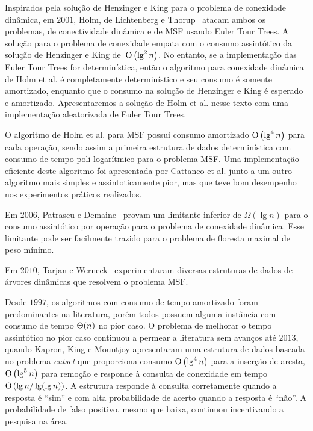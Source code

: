 Inspirados pela solução de Henzinger e King para o problema de conexidade dinâmica, em $2001$, Holm, de Lichtenberg e Thorup~\cite{poly_log} atacam ambos os problemas, de conectividade dinâmica e de MSF usando Euler Tour Trees. A solução para o problema de conexidade empata com o consumo assintótico da solução de Henzinger e King de~$\text{O}\left(\lg^2 n\right)$. No entanto, se a implementação das Euler Tour Trees for determinística, então o algoritmo para conexidade dinâmica de Holm et al. é completamente determinístico e seu consumo é somente amortizado, enquanto que o consumo na solução de Henzinger e King é esperado e amortizado. Apresentaremos a solução de Holm et al. nesse texto com uma implementação aleatorizada de Euler Tour Trees.

O algoritmo de Holm et al. para MSF possui consumo amortizado $\text{O}\left(\lg^4 n\right)$ para cada operação, sendo assim a primeira estrutura de dados determinística com consumo de tempo poli-logarítmico para o problema MSF. Uma implementação eficiente deste algoritmo foi apresentada por Cattaneo et al. \cite{xpstudy2002} junto a um outro algoritmo mais simples e assintoticamente pior, mas que teve bom desempenho nos experimentos práticos realizados.


Em $2006$, Patrascu e Demaine~\cite{lowerBoundPatrascu} provam um limitante inferior de $\Omega(\lg n)$ para o consumo assintótico por operação para o problema de conexidade dinâmica. Esse limitante pode ser facilmente trazido para o problema de floresta maximal de peso mínimo.

Em $2010$, Tarjan e Werneck~\cite{tarjanWerneck2010} experimentaram diversas estruturas de dados de árvores dinâmicas que resolvem o problema MSF.


Desde $1997$, os algoritmos com consumo de tempo amortizado foram predominantes na literatura, porém todos possuem alguma instância com consumo de tempo $\Theta(n)$ no pior caso. O problema de melhorar o tempo assintótico no pior caso continuou a permear a literatura sem avanços até $2013$, quando Kapron, King e Mountjoy \cite{bruceM} apresentaram uma estrutura de dados baseada no problema \textit{cutset} que proporciona consumo $\text{O}\left(\lg^4 n\right)$ para a inserção de aresta, $\text{O}\left(\lg^5 n\right)$ para remoção e responde à consulta de conexidade em tempo $\text{O}\left(\lg n / \lg(\lg n)\right)$. A estrutura responde à consulta corretamente quando a resposta é “sim” e com alta probabilidade de acerto quando a resposta é “não”. A probabilidade de falso positivo, mesmo que baixa, continuou incentivando a pesquisa na área. 

